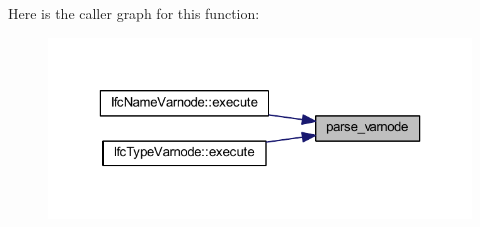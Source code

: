 Here is the caller graph for this function\+:
\nopagebreak
\begin{figure}[H]
\begin{center}
\leavevmode
\includegraphics[width=323pt]{grammar_8hh_a058251f048324838196c4589a82738ee_icgraph}
\end{center}
\end{figure}
